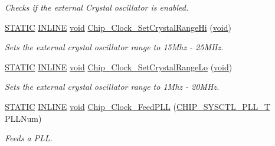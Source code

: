 \begin{DoxyCompactItemize}
\begin{DoxyCompactList}\small\item\em Checks if the external Crystal oscillator is enabled. \end{DoxyCompactList}\item 
\hyperlink{group__LPC__Types__Public__Macros_ga10b2d890d871e1489bb02b7e70d9bdfb}{S\-T\-A\-T\-I\-C} \hyperlink{group__LPC__Types__Public__Types_ga2eb6f9e0395b47b8d5e3eeae4fe0c116}{I\-N\-L\-I\-N\-E} \hyperlink{Paradigm_2Tern__EE_2small_2portmacro_8h_a14d32f8130d3c0b212cfc751730b5b49}{void} \hyperlink{group__CLOCK__17XX__40XX_ga6887346857de2ee7ec4d0cbc0b8d8396}{Chip\-\_\-\-Clock\-\_\-\-Set\-Crystal\-Range\-Hi} (\hyperlink{Paradigm_2Tern__EE_2small_2portmacro_8h_a14d32f8130d3c0b212cfc751730b5b49}{void})
\begin{DoxyCompactList}\small\item\em Sets the external crystal oscillator range to 15\-Mhz -\/ 25\-M\-Hz. \end{DoxyCompactList}\item 
\hyperlink{group__LPC__Types__Public__Macros_ga10b2d890d871e1489bb02b7e70d9bdfb}{S\-T\-A\-T\-I\-C} \hyperlink{group__LPC__Types__Public__Types_ga2eb6f9e0395b47b8d5e3eeae4fe0c116}{I\-N\-L\-I\-N\-E} \hyperlink{Paradigm_2Tern__EE_2small_2portmacro_8h_a14d32f8130d3c0b212cfc751730b5b49}{void} \hyperlink{group__CLOCK__17XX__40XX_ga9d93c4a5c3330839f8813d7d5bb55fd8}{Chip\-\_\-\-Clock\-\_\-\-Set\-Crystal\-Range\-Lo} (\hyperlink{Paradigm_2Tern__EE_2small_2portmacro_8h_a14d32f8130d3c0b212cfc751730b5b49}{void})
\begin{DoxyCompactList}\small\item\em Sets the external crystal oscillator range to 1\-Mhz -\/ 20\-M\-Hz. \end{DoxyCompactList}\item 
\hyperlink{group__LPC__Types__Public__Macros_ga10b2d890d871e1489bb02b7e70d9bdfb}{S\-T\-A\-T\-I\-C} \hyperlink{group__LPC__Types__Public__Types_ga2eb6f9e0395b47b8d5e3eeae4fe0c116}{I\-N\-L\-I\-N\-E} \hyperlink{Paradigm_2Tern__EE_2small_2portmacro_8h_a14d32f8130d3c0b212cfc751730b5b49}{void} \hyperlink{group__CLOCK__17XX__40XX_ga4d4cc965838cf2c5cddafd07aa66a790}{Chip\-\_\-\-Clock\-\_\-\-Feed\-P\-L\-L} (\hyperlink{group__SYSCTL__17XX__40XX_ga5f5478a201b021ed04a0724bff524c4b}{C\-H\-I\-P\-\_\-\-S\-Y\-S\-C\-T\-L\-\_\-\-P\-L\-L\-\_\-\-T} P\-L\-L\-Num)
\begin{DoxyCompactList}\small\item\em Feeds a P\-L\-L. \end{DoxyCompactList}\item 

\end{DoxyCompactItemize}
